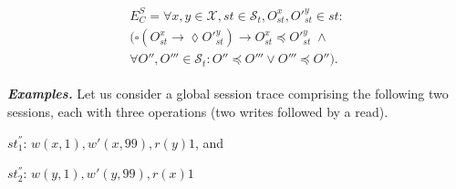 \documentclass[journal, compsoc]{IEEEtran}
\begin{document}
	\begin{align}\label{eqn:SC}
	\begin{split}
	E^S_C =  %
	\forall x,y \in \mathcal{X}, \mathit{st} \in \mathcal{S}_t, O_\mathit{st}^x, O'^{y}_\mathit{st} \in \mathit{st}:  \\
	\big( \square \left( O_\mathit{st}^x \rightarrow \lozenge O'^{y}_\mathit{st} \right)
	\rightarrow O_\mathit{st}^x \preccurlyeq O'^{y}_\mathit{st}  \; \wedge
	\\
	\forall O'', O''' \in \mathcal{S}_t:
	O'' \preccurlyeq O''' \vee O''' \preccurlyeq O'' \big). %
	\end{split}
	\end{align}
	
	\noindent \emph{\textbf{Examples.}}
	Let us consider a global session trace comprising the following two sessions, each with three operations (two writes followed by a read).
	
	$\mathit{st}_1^{''}$:   $w(x, 1), w'(x,99), r(y){1}$, and
	
	$\mathit{st}_2^{''}$:  $w(y, 1), w'(y,99), r(x){1}$
	
\end{document}
